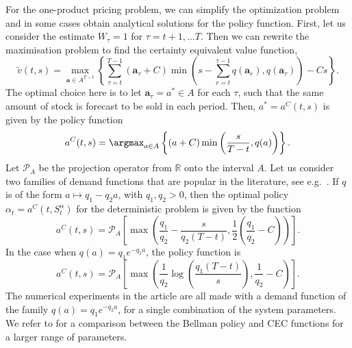 \documentclass[main.tex]{subfiles}
\begin{document}
For the one-product pricing problem, we can simplify the optimization
problem and in some cases obtain analytical solutions for the policy function.
First, let us consider the estimate $W_\tau=1$ for $\tau=t+1,\dots T$.
Then we can rewrite the maximisation problem to find
the certainty equivalent value function,
\begin{equation}
  \widetilde{v}(t,s)=
  \max_{\mathbf a\in A^{T-t}}\left\{\sum_{\tau=t}^{T-1}(\mathbf
    a_\tau+C)\min\left(s-\sum_{r=t}^{\tau-1}q(\mathbf a_r),q(\mathbf a_\tau)\right)-Cs\right\}.
\end{equation}
The optimal choice here is to let $\mathbf a_\tau=a^*\in A$ for each
$\tau$, such that the same amount of stock is forecast to be sold in
each period.
Then, $a^*=a^C(t,s)$ is given by the policy function
\begin{equation}
  a^C(t,s)=\argmax_{a\in A} \left\{(a+C)\min\left(
      \frac{s}{T-t},q(a)
    \right)\right\}.
\end{equation}
Let $\mathcal P_A$ be the projection operator from $\mathbb R$ onto the interval $A$.
Let us consider two families of demand functions that are
popular in the literature, see e.g.~\citet[Ch.~7]{talluri2006theory}.
If $q$ is of the form $a\mapsto q_1-q_2a$, with $q_1,q_2> 0$, then
the optimal policy $\alpha_t=a^C(t,S_t^\alpha)$ for the deterministic
problem is given by the function
\begin{equation}
  a^C(t,s)=\mathcal P_A \left[ \max\left(
      \frac{q_1}{q_2}-\frac{s}{q_2(T-t)},\frac{1}{2}\left(\frac{q_1}{q_2}-C
      \right) \right) \right].
\end{equation}
In the case when $q(a)=q_1e^{-q_2a}$, the policy function is
\begin{equation}\label{eq:cec_policy}
  a^C(t,s)=\mathcal P_A\left[
    \max\left( \frac{1}{q_2}\log\left( \frac{q_1(T-t)}{s}\right),
      \frac{1}{q_2}-C  \right)\right].
\end{equation}
The numerical experiments in the article are all made
with a demand function of the family $q(a)=q_1e^{-q_2a}$,  for a
single combination of the  system
parameters. We refer to  for a
comparison between the Bellman policy and CEC functions for a larger
range of parameters.
\end{document}
